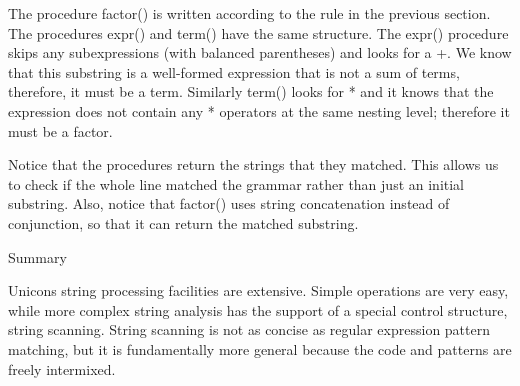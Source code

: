 The procedure \textsf{factor()} is written according to the rule in the
previous section. The procedures \textsf{expr()} and \textsf{term()}
have the same structure. The \textsf{expr()} procedure skips any
subexpressions (with balanced parentheses) and looks for a \textsf{+}.
We know that this substring is a well-formed expression that is not a
sum of terms, therefore, it must be a term. Similarly \textsf{term()}
looks for \textsf{*} and it knows that the expression does not contain
any \textsf{*} operators at the same nesting level; therefore it must
be a factor.

Notice that the procedures return the strings that they matched. This
allows us to check if the whole line matched the grammar rather than
just an initial substring. Also, notice that \textsf{factor()} uses
string concatenation instead of conjunction, so that it can return the
matched substring.

{\sffamily
Summary}

Unicon{\textquotesingle}s string processing facilities are extensive.
Simple operations are very easy, while more complex string analysis has
the support of a special control structure, string scanning. String
scanning is not as concise as regular expression pattern matching, but
it is fundamentally more general because the code and patterns are
freely intermixed.

